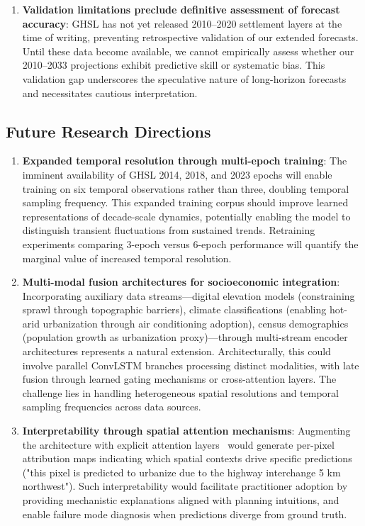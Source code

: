 \documentclass[conference]{IEEEtran}
\begin{document}
\begin{enumerate}
    \item \textbf{Validation limitations preclude definitive assessment of forecast accuracy}: GHSL has not yet released 2010--2020 settlement layers at the time of writing, preventing retrospective validation of our extended forecasts. Until these data become available, we cannot empirically assess whether our 2010--2033 projections exhibit predictive skill or systematic bias. This validation gap underscores the speculative nature of long-horizon forecasts and necessitates cautious interpretation.
\end{enumerate}

\subsection{Future Research Directions}
\begin{enumerate}
    \item \textbf{Expanded temporal resolution through multi-epoch training}: The imminent availability of GHSL 2014, 2018, and 2023 epochs will enable training on six temporal observations rather than three, doubling temporal sampling frequency. This expanded training corpus should improve learned representations of decade-scale dynamics, potentially enabling the model to distinguish transient fluctuations from sustained trends. Retraining experiments comparing 3-epoch versus 6-epoch performance will quantify the marginal value of increased temporal resolution.
    
    \item \textbf{Multi-modal fusion architectures for socioeconomic integration}: Incorporating auxiliary data streams---digital elevation models (constraining sprawl through topographic barriers), climate classifications (enabling hot-arid urbanization through air conditioning adoption), census demographics (population growth as urbanization proxy)---through multi-stream encoder architectures represents a natural extension. Architecturally, this could involve parallel ConvLSTM branches processing distinct modalities, with late fusion through learned gating mechanisms or cross-attention layers. The challenge lies in handling heterogeneous spatial resolutions and temporal sampling frequencies across data sources.
    
    \item \textbf{Interpretability through spatial attention mechanisms}: Augmenting the architecture with explicit attention layers~\cite{vaswani2017} would generate per-pixel attribution maps indicating which spatial contexts drive specific predictions ("this pixel is predicted to urbanize due to the highway interchange 5 km northwest"). Such interpretability would facilitate practitioner adoption by providing mechanistic explanations aligned with planning intuitions, and enable failure mode diagnosis when predictions diverge from ground truth.
    

\end{enumerate}
\end{document}
